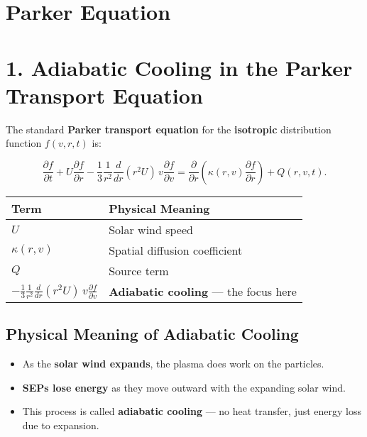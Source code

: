 \section{Parker Equation}

\section*{\texorpdfstring{ \textbf{1. Adiabatic Cooling in the Parker Transport Equation}}{}}

The standard \textbf{Parker transport equation} for the \textbf{isotropic} distribution function $f(v, r, t)$ is:

\begin{equation}
\frac{\partial f}{\partial t}
+ U \frac{\partial f}{\partial r}
- \frac{1}{3} \frac{1}{r^2} \frac{d}{dr}(r^2 U) \, v \frac{\partial f}{\partial v}
= \frac{\partial}{\partial r} \left( \kappa(r,v) \frac{\partial f}{\partial r} \right) + Q(r,v,t).
\tag{1}
\end{equation}

\begin{center}
\begin{tabular}{@{}ll@{}}
\toprule
\textbf{Term} & \textbf{Physical Meaning} \\
\midrule
$U$ & Solar wind speed \\
$\kappa(r,v)$ & Spatial diffusion coefficient \\
$Q$ & Source term \\
$-\frac{1}{3} \frac{1}{r^2} \frac{d}{dr}(r^2 U) \, v \frac{\partial f}{\partial v}$ & \textbf{Adiabatic cooling} --- the focus here \\
\bottomrule
\end{tabular}
\end{center}

\hrulefill

\subsection*{Physical Meaning of Adiabatic Cooling}

\begin{itemize}
    \item As the \textbf{solar wind expands}, the plasma does work on the particles.
    \item \textbf{SEPs lose energy} as they move outward with the expanding solar wind.
    \item This process is called \textbf{adiabatic cooling} — no heat transfer, just energy loss due to expansion.
\end{itemize}

